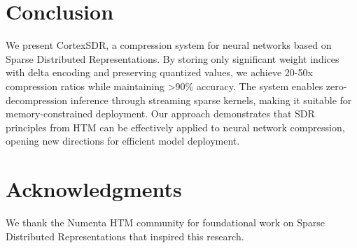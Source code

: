 \documentclass[11pt]{article}
\begin{document}
\section{Conclusion}

We present CortexSDR, a compression system for neural networks based on Sparse Distributed Representations. By storing only significant weight indices with delta encoding and preserving quantized values, we achieve 20-50x compression ratios while maintaining >90\% accuracy. The system enables zero-decompression inference through streaming sparse kernels, making it suitable for memory-constrained deployment. Our approach demonstrates that SDR principles from HTM can be effectively applied to neural network compression, opening new directions for efficient model deployment.

\section*{Acknowledgments}

We thank the Numenta HTM community for foundational work on Sparse Distributed Representations that inspired this research.



\end{document}
